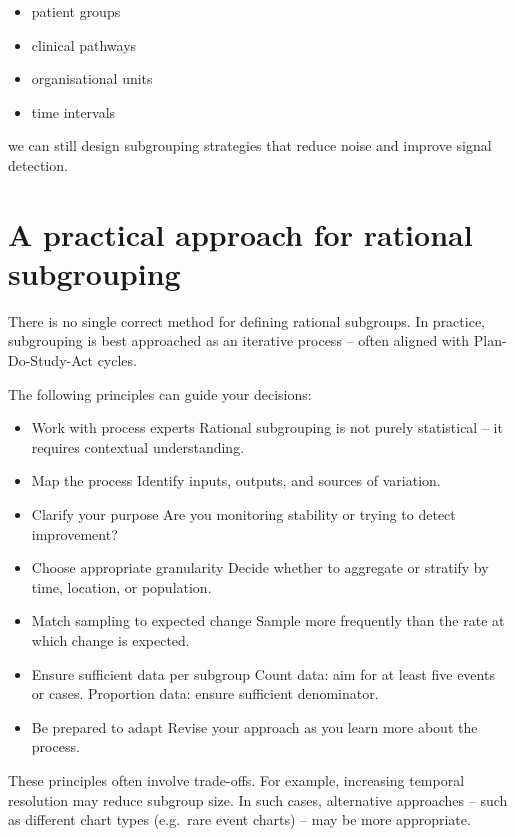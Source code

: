 \documentclass[
]{book}
\providecommand{\tightlist}{%
  \setlength{\itemsep}{0pt}\setlength{\parskip}{0pt}}
\begin{document}
\begin{itemize}
\tightlist
\item
  patient groups
\item
  clinical pathways
\item
  organisational units
\item
  time intervals
\end{itemize}

we can still design subgrouping strategies that reduce noise and improve
signal detection.

\section{A practical approach for rational
subgrouping}\label{a-practical-approach-for-rational-subgrouping}

There is no single correct method for defining rational subgroups. In
practice, subgrouping is best approached as an iterative process --
often aligned with Plan-Do-Study-Act cycles.

The following principles can guide your decisions:

\begin{itemize}
\item
  Work with process experts Rational subgrouping is not purely
  statistical -- it requires contextual understanding.
\item
  Map the process Identify inputs, outputs, and sources of variation.
\item
  Clarify your purpose Are you monitoring stability or trying to detect
  improvement?
\item
  Choose appropriate granularity Decide whether to aggregate or stratify
  by time, location, or population.
\item
  Match sampling to expected change Sample more frequently than the rate
  at which change is expected.
\item
  Ensure sufficient data per subgroup Count data: aim for at least five
  events or cases. Proportion data: ensure sufficient denominator.
\item
  Be prepared to adapt Revise your approach as you learn more about the
  process.
\end{itemize}

These principles often involve trade-offs. For example, increasing
temporal resolution may reduce subgroup size. In such cases, alternative
approaches -- such as different chart types (e.g.~rare event charts) --
may be more appropriate.
\end{document}
